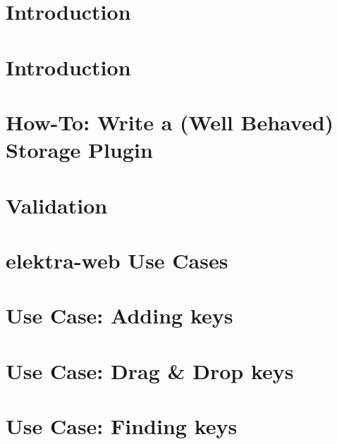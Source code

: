\documentclass[twoside]{book}
\newcommand{\+}{\discretionary{\mbox{\scriptsize$\hookleftarrow$}}{}{}}
\begin{document}
\chapter{Introduction}
\label{doc_tutorials_run_all_tests_with_docker_md}

\chapter{Introduction}
\label{doc_tutorials_run_reformatting_script_with_docker_md}

\chapter{How-\/\+To\+: Write a (Well Behaved) Storage Plugin}
\label{doc_tutorials_storage-plugins_md}

\chapter{Validation}
\label{doc_tutorials_validation_md}

\chapter{elektra-\/web Use Cases}
\label{doc_usecases_elektra_web_README_md}

\chapter{Use Case\+: Adding keys}
\label{doc_usecases_elektra_web_UC_adding_keys_md}

\chapter{Use Case\+: Drag \& Drop keys}
\label{doc_usecases_elektra_web_UC_drag_n_drop_md}

\chapter{Use Case\+: Finding keys}
\label{doc_usecases_elektra_web_UC_finding_keys_md}

\end{document}
